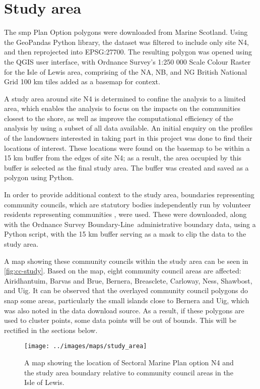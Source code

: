 \section{Study area}

The \gls{smp} Plan Option polygons were downloaded from Marine Scotland. Using the GeoPandas Python library, the dataset was filtered to include only site N4, and then reprojected into EPSG:27700. The resulting polygon was opened using the QGIS user interface, with Ordnance Survey's 1:250 000 Scale Colour Raster for the Isle of Lewis area, comprising of the NA, NB, and NG British National Grid 100 km tiles added as a basemap for context.

A study area around site N4 is determined to confine the analysis to a limited area, which enables the analysis to focus on the impacts on the communities closest to the shore, as well as improve the computational efficiency of the analysis by using a subset of all data available. An initial enquiry on the profiles of the landowners interested in taking part in this project was done to find their locations of interest. These locations were found on the basemap to be within a 15 km buffer from the edges of site N4; as a result, the area occupied by this buffer is selected as the final study area. The buffer was created and saved as a polygon using Python.

In order to provide additional context to the study area, boundaries representing community councils, which are statutory bodies independently run by volunteer residents representing communities \autocite{cnes-cc}, were used. These were downloaded, along with the Ordnance Survey Boundary-Line\texttrademark\ administrative boundary data, using a Python script, with the 15 km buffer serving as a mask to clip the data to the study area.

A map showing these community councils within the study area can be seen in \autoref{fig:cc-study}. Based on the map, eight community council areas are affected: Airidhantuim, Barvas and Brue, Bernera, Breasclete, Carloway, Ness, Shawbost, and Uig. It can be observed that the overlayed community council polygons do snap some areas, particularly the small islands close to Bernera and Uig, which was also noted in the data download source. As a result, if these polygons are used to cluster points, some data points will be out of bounds. This will be rectified in the sections below.

\begin{figure}
  \centering
  \texttt{[image: ../images/maps/study\_area]}
  \caption{A map showing the location of Sectoral Marine Plan option N4 and the study area boundary relative to community council areas in the Isle of Lewis. \label{fig:cc-study}}
\end{figure}


